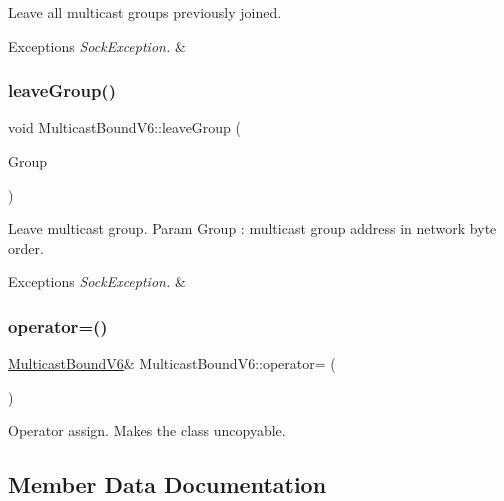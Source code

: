 Leave all multicast groups previously joined. 
\begin{DoxyExceptions}{Exceptions}
{\em Sock\+Exception.} & \\
\hline
\end{DoxyExceptions}
\mbox{\label{classMulticastBoundV6_a7264da712de9e131b3a3ab1e8a86942a}} 
\subsubsection{\texorpdfstring{leave\+Group()}{leaveGroup()}}
{\footnotesize\ttfamily void Multicast\+Bound\+V6\+::leave\+Group (\begin{DoxyParamCaption}\item[{in6\+\_\+addr}]{Group }\end{DoxyParamCaption})}

Leave multicast group. Param Group \+: multicast group address in network byte order. 
\begin{DoxyExceptions}{Exceptions}
{\em Sock\+Exception.} & \\
\hline
\end{DoxyExceptions}
\mbox{\label{classMulticastBoundV6_a5bcf54776fe97dd2ffd26a36de092284}} 
\subsubsection{\texorpdfstring{operator=()}{operator=()}}
{\footnotesize\ttfamily \hyperlink{classMulticastBoundV6}{Multicast\+Bound\+V6}\& Multicast\+Bound\+V6\+::operator= (\begin{DoxyParamCaption}\item[{\hyperlink{classMulticastBoundV6}{Multicast\+Bound\+V6} \&}]{ }\end{DoxyParamCaption})\hspace{0.3cm}{\ttfamily [private]}}

Operator assign. Makes the class uncopyable. 

\subsection{Member Data Documentation}
\mbox{\label{classMulticastBoundV6_a792a38740cf29b50fb74785b12358988}} 
